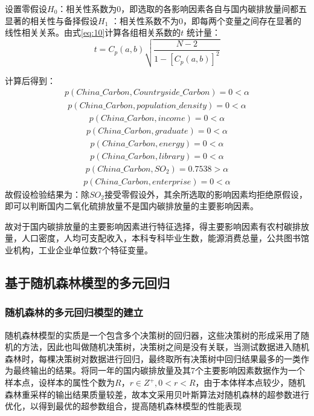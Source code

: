 \documentclass[withoutpreface,bwprint]{cumcmthesis}
\begin{document}
	设置零假设$H_0$：相关性系数为0，即选取的各影响因素各自与国内碳排放量间都五显著的相关性与备择假设$H_{1}$ ：相关性系数不为0，即每两个变量之间存在显著的线性相关关系。由式\eqref{eq:10}计算各组相关系数的$t$ 统计量：
	\begin{equation}
		\label{eq:10}
		t={{C}_{p}}(a,b)\sqrt{\frac{N-2}{1-{{\left [{{{C}_{p}}(a,b)}\right ]}^{2}}}}
	\end{equation}
	
	计算后得到：
	\begin{align*}
		p(China\_Carbon,Countryside\_Carbon)=0<\alpha
	\end{align*}
	\begin{align*}
		p(China\_Carbon,population\_density)=0<\alpha
	\end{align*}
	\begin{align*}
		p(China\_Carbon,income)=0<\alpha
	\end{align*}
	\begin{align*}
		p(China\_Carbon,graduate)=0<\alpha
	\end{align*}
	\begin{align*}
		p(China\_Carbon,energy)=0<\alpha
	\end{align*}
	\begin{align*}
		p(China\_Carbon,library)=0<\alpha
	\end{align*}
	\begin{align*}
		p(China\_Carbon,SO_2)=0.7538>\alpha
	\end{align*}
	\begin{align*}
		p(China\_Carbon,enterprise)=0<\alpha
	\end{align*}
	故假设检验结果为：除$SO_2$接受零假设外，其余所选取的影响因素均拒绝原假设，即可以判断国内二氧化硫排放量不是国内碳排放量的主要影响因素。
	
	故对于国内碳排放量的主要影响因素进行特征选择，得主要影响因素有农村碳排放量，人口密度，人均可支配收入，本科专科毕业生数，能源消费总量，公共图书馆业机构，工业企业单位数7个特征变量。
	
	\subsection{基于随机森林模型的多元回归}
	\subsubsection{随机森林的多元回归模型的建立}
	随机森林模型的实质是一个包含多个决策树的回归器，这些决策树的形成采用了随机的方法，因此也叫做随机决策树，决策树之间是没有关联，当测试数据进入随机森林时，每棵决策树对数据进行回归，最终取所有决策树中回归结果最多的一类作为最终输出的结果。将同一年的国内碳排放量及其7个主要影响因素数据作为一个样本点，设样本的属性个数为$R$，$r \in {Z^ + },0<r<R$，由于本体样本点较少，随机森林重采样的输出结果质量较差，故本文采用贝叶斯算法对随机森林的超参数进行优化，以得到最优的超参数组合，提高随机森林模型的性能表现
	
\end{document}
